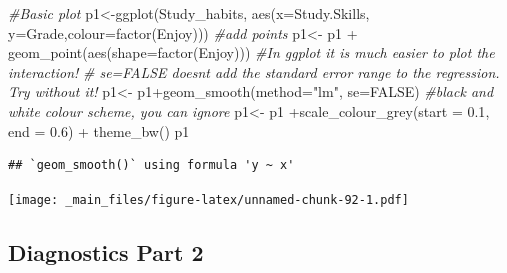 \documentclass[
]{gitbook}
\newenvironment{Shaded}{\begin{snugshade}}{\end{snugshade}}
\newcommand{\AttributeTok}[1]{\textcolor[rgb]{0.77,0.63,0.00}{#1}}
\newcommand{\CommentTok}[1]{\textcolor[rgb]{0.56,0.35,0.01}{\textit{#1}}}
\newcommand{\ConstantTok}[1]{\textcolor[rgb]{0.00,0.00,0.00}{#1}}
\newcommand{\FloatTok}[1]{\textcolor[rgb]{0.00,0.00,0.81}{#1}}
\newcommand{\FunctionTok}[1]{\textcolor[rgb]{0.00,0.00,0.00}{#1}}
\newcommand{\NormalTok}[1]{#1}
\newcommand{\OtherTok}[1]{\textcolor[rgb]{0.56,0.35,0.01}{#1}}
\newcommand{\SpecialCharTok}[1]{\textcolor[rgb]{0.00,0.00,0.00}{#1}}
\newcommand{\StringTok}[1]{\textcolor[rgb]{0.31,0.60,0.02}{#1}}
\begin{document}
\begin{Shaded}
\begin{Highlighting}[]
\CommentTok{\#Basic plot}
\NormalTok{p1}\OtherTok{\textless{}{-}}\FunctionTok{ggplot}\NormalTok{(Study\_habits, }\FunctionTok{aes}\NormalTok{(}\AttributeTok{x=}\NormalTok{Study.Skills, }\AttributeTok{y=}\NormalTok{Grade,}\AttributeTok{colour=}\FunctionTok{factor}\NormalTok{(Enjoy)))}
\CommentTok{\#add points}
\NormalTok{p1}\OtherTok{\textless{}{-}}\NormalTok{ p1 }\SpecialCharTok{+} \FunctionTok{geom\_point}\NormalTok{(}\FunctionTok{aes}\NormalTok{(}\AttributeTok{shape=}\FunctionTok{factor}\NormalTok{(Enjoy)))}
\CommentTok{\#In ggplot it is much easier to plot the interaction!}
\CommentTok{\# se=FALSE doesn\textquotesingle{}t add the standard error range to the regression. Try without it!}
\NormalTok{p1}\OtherTok{\textless{}{-}}\NormalTok{ p1}\SpecialCharTok{+}\FunctionTok{geom\_smooth}\NormalTok{(}\AttributeTok{method=}\StringTok{"lm"}\NormalTok{, }\AttributeTok{se=}\ConstantTok{FALSE}\NormalTok{) }
\CommentTok{\#black and white colour scheme, you can ignore}
\NormalTok{p1}\OtherTok{\textless{}{-}}\NormalTok{ p1 }\SpecialCharTok{+}\FunctionTok{scale\_colour\_grey}\NormalTok{(}\AttributeTok{start =} \FloatTok{0.1}\NormalTok{, }\AttributeTok{end =} \FloatTok{0.6}\NormalTok{)  }\SpecialCharTok{+} \FunctionTok{theme\_bw}\NormalTok{()}
\NormalTok{p1}
\end{Highlighting}
\end{Shaded}

\begin{verbatim}
## `geom_smooth()` using formula 'y ~ x'
\end{verbatim}

\texttt{[image: \_main\_files/figure-latex/unnamed-chunk-92-1.pdf]}


\newpage

\hypertarget{diagnostics-part-2}{%
\subsection{Diagnostics Part 2}\label{diagnostics-part-2}}
\end{document}
